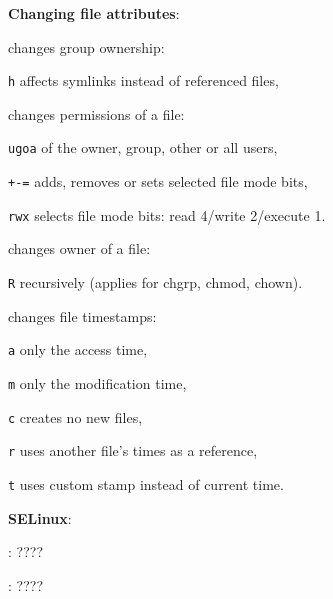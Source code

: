 \textbf{Changing file attributes}:
\begin{compactenum}
	\item [\symbolcoreutils]  changes group ownership:
	\item [\texttt{h}] affects symlinks instead of referenced files,

	\item [\symbolcoreutils]  changes permissions of a file:
	\item [\texttt{ugoa}] of the owner, group, other or all users,
	\item [\texttt{+-=}] adds, removes or sets selected file mode bits,
	\item [\texttt{rwx}] selects file mode bits: read 4/write 2/execute 1.
	
	\item [\symbolcoreutils]  changes owner of a file:
	\item [\texttt{R}] recursively (applies for chgrp, chmod, chown).

	\item [\symbolcoreutils]  changes file timestamps:
	\item [\texttt{a}] only the access time,
	\item [\texttt{m}] only the modification time,
	\item [\texttt{c}] creates no new files,
	\item [\texttt{r}] uses another file's times as a reference,
	\item [\texttt{t}] uses custom stamp instead of current time.
\end{compactenum}

\textbf{SELinux}:
\begin{compactenum}
	\item [\symbolcoreutils] : \dotfill ????
	\item [\symbolcoreutils] : \dotfill ????
\end{compactenum}

